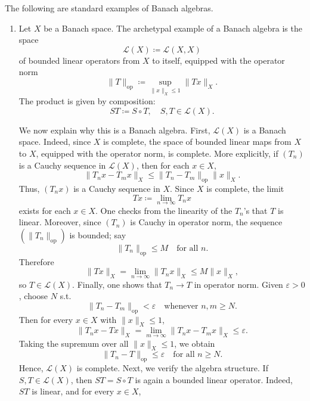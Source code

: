 \begin{eg}
    The following are standard examples of Banach algebras. 
    \begin{enumerate}
        \item Let \(X\) be a Banach space. The archetypal example of a Banach algebra is the space
        \[
            \mathcal{L} (X) \coloneqq \mathcal{L} (X, X)
        \]
        of bounded linear operators from \(X\) to itself, equipped with the operator norm 
        \[
            \lVert T \rVert_{\mathrm{op}} \coloneqq \sup _{\lVert x \rVert_X \le 1} \lVert Tx \rVert_X.  
        \] 
        The product is given by composition:
        \[
            ST \coloneqq S \circ T, \quad S, T \in \mathcal{L} (X).
        \]

        We now explain why this is a Banach algebra. First, \(\mathcal{L} (X)\) is a Banach space. Indeed, since \(X\) is complete, the space of bounded linear maps from \(X\) to \(X\), equipped with the operator norm, is complete. More explicitly, if \((T_n)\) is a Cauchy sequence in \(\mathcal{L} (X)\), then for each \(x \in X\),
        \[
            \lVert T_n x - T_m x \rVert_X \le \lVert T_n - T_m \rVert_{\mathrm{op} } \lVert x \rVert_X.   
        \]       
        Thus, \((T_n x)\) is a Cauchy sequence in \(X\). Since \(X\) is complete, the limit 
        \[
            Tx \coloneqq \lim_{n \to \infty} T_n x 
        \]   
        exists for each \(x \in X\). One checks from the linearity of the \(T_n\)'s that \(T\) is linear. Moreover, since \((T_n)\) is Cauchy in operator norm, the sequence \((\lVert T_n \rVert_{\mathrm{op} } )\) is bounded; say 
        \[
            \lVert T_n \rVert_{\mathrm{op} } \le M \quad \text{for all } n.  
        \]     
        Therefore 
        \[
            \lVert T x \rVert_X = \lim_{n \to \infty} \lVert T_n x \rVert_X \le M \lVert x \rVert_X,    
        \]
        so \(T \in \mathcal{L} (X)\). Finally, one shows that \(T_n \to T\) in operator norm. Given \(\varepsilon > 0\), choose \(N\) s.t.
        \[
            \lVert T_n - T_m \rVert_{\mathrm{op} } < \varepsilon \quad \text{whenever } n, m \ge N.  
        \]    
        Then for every \(x \in X\) with \(\lVert x \rVert_X \le 1 \), 
        \[
            \lVert T_n x - T x \rVert_X = \lim_{m \to \infty} \lVert T_n x - T_m x \rVert_X \le \varepsilon.   
        \]  
        Taking the supremum over all \(\lVert x \rVert_X \le 1\), we obtain 
        \[
            \lVert T_n - T \rVert_{\mathrm{op} } \le \varepsilon \quad \text{for all } n \ge N.  
        \] 
        Hence, \(\mathcal{L} (X)\) is complete. Next, we verify the algebra structure. If \(S, T \in \mathcal{L} (X)\), then \(S T = S \circ T\) is again a bounded linear operator. Indeed, \(S T\) is linear, and for every \(x \in X\),

\end{enumerate}
\end{eg}
